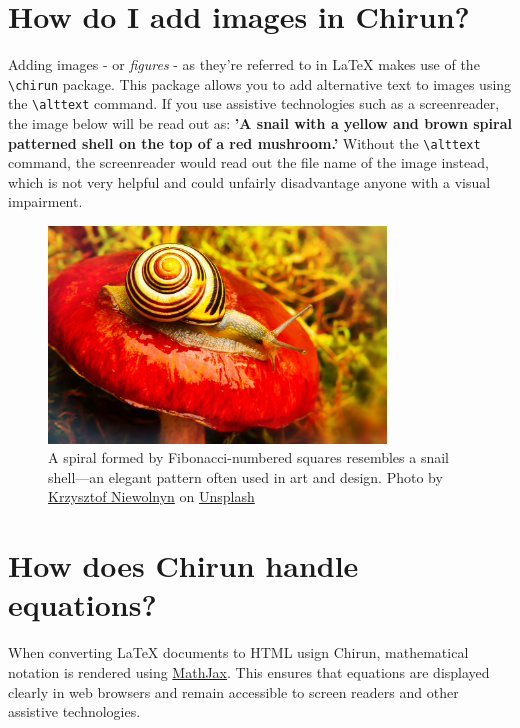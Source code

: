 \documentclass{article} %
\begin{document}
\section{How do I add images in Chirun?} %

Adding images - or \textit{figures} - as they're referred to in LaTeX makes use of the \verb|\chirun| package. This package allows you to add alternative text to images using the \verb|\alttext| command. If you use assistive technologies such as a screenreader, the image below will be read out as: \textbf{'A snail with a yellow and brown spiral patterned shell on the top of a red mushroom.'} Without the \verb|\alttext| command, the screenreader would read out the file name of the image instead, which is not very helpful and could unfairly disadvantage anyone with a visual impairment.

\begin{figure}
   \includegraphics[width=0.8\textwidth]{images/snail.jpg}
    \caption{A spiral formed by Fibonacci-numbered squares resembles a snail shell—an elegant pattern often used in art and design. Photo by \href{https://unsplash.com/@epan5?utm_content=creditCopyText&utm_medium=referral&utm_source=unsplash}{Krzysztof Niewolnyn} on \href{https://unsplash.com/photos/brown-snail-on-red-mushroom-during-daytime-q6wb__wgnew}{Unsplash}}
\end{figure}

\section{How does Chirun handle equations?}
When converting LaTeX documents to HTML usign Chirun, mathematical notation is rendered using \href{https://www.mathjax.org/}{MathJax}. This ensures that equations are displayed clearly in web browsers and remain accessible to screen readers and other assistive technologies.
\end{document}
